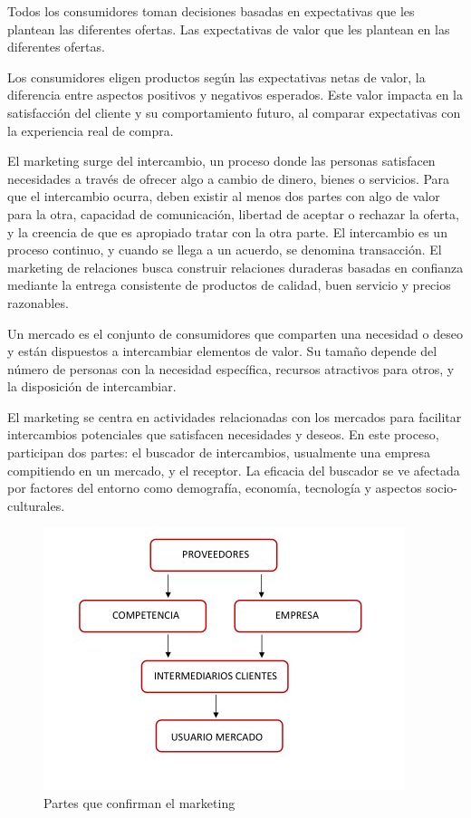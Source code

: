 \documentclass[
    a4paper, %
    10pt, %
    unnumberedsections, %
    twoside, %
]{LTJournalArticle}
\begin{document}
 Todos los consumidores toman decisiones basadas en expectativas que les plantean las diferentes ofertas. Las expectativas de valor que les plantean en las diferentes ofertas. 
 
Los consumidores eligen productos según las expectativas netas de valor, la diferencia entre aspectos positivos y negativos esperados. Este valor impacta en la satisfacción del cliente y su comportamiento futuro, al comparar expectativas con la experiencia real de compra.

El marketing surge del intercambio, un proceso donde las personas satisfacen necesidades a través de ofrecer algo a cambio de dinero, bienes o servicios. Para que el intercambio ocurra, deben existir al menos dos partes con algo de valor para la otra, capacidad de comunicación, libertad de aceptar o rechazar la oferta, y la creencia de que es apropiado tratar con la otra parte. El intercambio es un proceso continuo, y cuando se llega a un acuerdo, se denomina transacción. El marketing de relaciones busca construir relaciones duraderas basadas en confianza mediante la entrega consistente de productos de calidad, buen servicio y precios razonables.


Un mercado es el conjunto de consumidores que comparten una necesidad o deseo y están dispuestos a intercambiar elementos de valor. Su tamaño depende del número de personas con la necesidad específica, recursos atractivos para otros, y la disposición de intercambiar.

El marketing se centra en actividades relacionadas con los mercados para facilitar intercambios potenciales que satisfacen necesidades y deseos. En este proceso, participan dos partes: el buscador de intercambios, usualmente una empresa compitiendo en un mercado, y el receptor. La eficacia del buscador se ve afectada por factores del entorno como demografía, economía, tecnología y aspectos socio-culturales.

\begin{figure}[h]
  \centering
  \includegraphics[width=0.7\linewidth]{./images/graph-mkt.jpg}
  \caption{Partes que confirman el marketing}
  \label{fig:etiqueta}
\end{figure}
\end{document}
